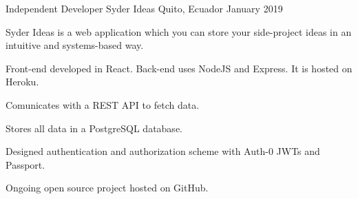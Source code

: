 
\begin{cventries}

    
  \cventry
    {Independent Developer}
    {Syder Ideas}
    {Quito, Ecuador}
    {January 2019}
    {
      \begin{cvitems}
        \item {Syder Ideas is a web application which you can store your side-project ideas in an intuitive and systems-based way.}
        \item {Front-end developed in React. Back-end uses NodeJS and Express. It is hosted on Heroku.}
        \item {Comunicates with a REST API to fetch data.}
        \item {Stores all data in a PostgreSQL database.}
        \item {Designed authentication and authorization scheme with Auth-0 JWTs and Passport.}
        \item {Ongoing open source project hosted on GitHub.}
      \end{cvitems}
    }
        
\end{cventries}
